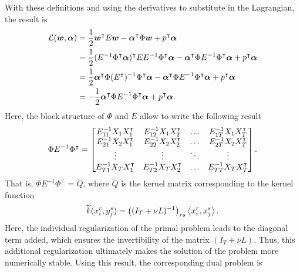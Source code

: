 With these definitions and using the derivatives to substitute in the Lagrangian, the result is
\begin{align*}
    \mathcal{L}(\bm{w}, \bm{\alpha}) &= \frac{1}{2} \bm{w}^\intercal E \bm{w} - \bm{\alpha}^\intercal \Phi \bm{w} + p^\intercal \bm{\alpha} \\
    &= \frac{1}{2} (E^{-1} \Phi^\intercal \bm{\alpha})^\intercal E E^{-1} \Phi^\intercal \bm{\alpha} - \bm{\alpha}^\intercal \Phi E^{-1} \Phi^\intercal \bm{\alpha} + p^\intercal \bm{\alpha} \\
    &= \frac{1}{2} \bm{\alpha}^\intercal \Phi ({E^\intercal})^{-1} \Phi^\intercal \bm{\alpha}  - \bm{\alpha}^\intercal \Phi E^{-1} \Phi^\intercal \bm{\alpha} + p^\intercal \bm{\alpha} \\
    &= -\frac{1}{2}  \bm{\alpha}^\intercal \Phi E^{-1} \Phi^\intercal \bm{\alpha} + p^\intercal \bm{\alpha}.
\end{align*}
Here, the block structure of $\Phi$ and $E$ allow to write the following result 
\begin{equation}
    \label{eq:laplacian_block_linear}
    \Phi E^{-1} \Phi^\intercal = 
    \begin{bmatrix}
        E^{-1}_{11} X_1 X_1^\intercal & E^{-1}_{12} X_1 X_2^\intercal & \ldots & E^{-1}_{1\ntasks} X_1 X_\ntasks^\intercal \\
        E^{-1}_{21} X_2 X_1^\intercal & E^{-1}_{22} X_2 X_2^\intercal & \ldots & E^{-1}_{2\ntasks} X_2 X_\ntasks^\intercal \\
        \vdots & \vdots & \ddots & \vdots \\
        E^{-1}_{\ntasks1} X_\ntasks X_1^\intercal & E^{-1}_{\ntasks 2} X_\ntasks X_2^\intercal & \ldots & E^{-1}_{\ntasks \ntasks} X_\ntasks X_\ntasks^\intercal \\
    \end{bmatrix} .
\end{equation}
That is, $\Phi E^{-1} \Phi^\intercal = \widetilde{Q}$, where $ \widetilde{Q}$ is the kernel matrix corresponding to the kernel function 
\begin{equation}
    \label{eq:kernelfun_gl}
    \widetilde{k}(x_i^r, y_j^s) =  \left((I_T + \nu L)^{-1}\right)_{rs} \dotp{x_i^r}{x_j^s}.
\end{equation}
Here, the individual regularization of the primal problem leads to the diagonal term added, which ensures the invertibility of the matrix $(I_T + \nu L)$.
Thus, this additional regularization ultimately makes the solution of the problem more numerically stable.
Using this result, the corresponding dual problem is
